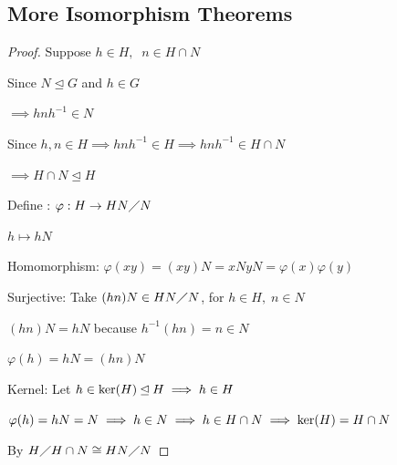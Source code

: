 \subsection{More Isomorphism Theorems}


\begin{proof}
    Suppose $h\in H,\;\; n\in H \cap N$

    Since $N \unlhd G$ and $h\in G$

    $\implies hnh^{-1} \in N$

    Since $h,n \in H \implies hnh^{-1} \in H \implies hnh^{-1} \in H \cap N$

    $\implies H \cap N \unlhd H$

    Define : $\varphi: H \rightarrow HN \diagup N$

    \hspace{0.87in}$h \mapsto hN$

    Homomorphism: $\varphi(xy)=(xy)N=xNyN=\varphi(x)\varphi(y)$

    Surjective: Take $(hn)N\in HN \diagup N$, for $h \in H,\; n\in N$

    $(hn)N=hN$ because $h^{-1}(hn)=n \in N$

    $\varphi(h)=hN=(hn)N$

    Kernel: Let $h \in \text{ker}(H) \unlhd H \implies h \in H$

    $\varphi(h)=hN=N \implies h \in N \implies h\in H\cap N \implies \text{ker}(H) = H \cap N$

    By  $H\diagup H \cap N \cong HN \diagup N$
\end{proof}


